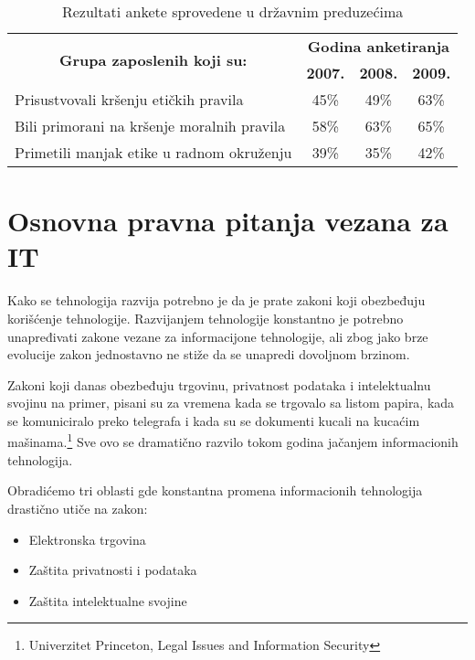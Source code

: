 \documentclass[a4paper]{article}
\begin{document}
{\begin{table}[h!]
\begin{adjustbox}{width=\textwidth}
\begin{tabular}{|l|l|c|c|c|}
\hline
\multicolumn{2}{|c|}{\multirow{2}{*}{\textbf{Grupa zaposlenih koji su:}}}         & \multicolumn{3}{c|}{\textbf{Godina anketiranja}} \\ \cline{3-5} 
\multicolumn{2}{|c|}{}  & \textbf{2007.}    & \textbf{2008.}   & \textbf{2009.}   \\ \hline
\multicolumn{2}{|l|}{\small{Prisustvovali kršenju etičkih pravila}}      & 45\%  & 49\% & 63\%  \\ \hline
\multicolumn{2}{|l|}{\small{Bili primorani na kršenje moralnih pravila}} & 58\%  & 63\% & 65\%  \\ \hline
\multicolumn{2}{|l|}{\small{Primetili manjak etike u radnom okruženju}}  & 39\%  & 35\% & 42\%  \\ \hline
\end{tabular} 
\end{adjustbox} 
\caption{Rezultati ankete sprovedene u državnim preduzećima}
\label{}
\end{table} 

\section{Osnovna pravna pitanja vezana za IT}

Kako se tehnologija razvija potrebno je da je prate zakoni koji obez\-be\-đu\-ju korišćenje tehnologije. Razvijanjem tehnologije konstantno je potrebno unapređivati zakone vezane za informacijone tehnologije, ali zbog jako brze evolucije zakon jednostavno ne stiže da se unapredi dovoljnom brzinom.

Zakoni koji danas obezbeđuju trgovinu, privatnost podataka i intelektualnu svojinu na primer, pisani su za vremena kada se trgovalo sa listom papira, kada se komuniciralo preko telegrafa i kada su se dokumenti kucali na kucaćim mašinama.\footnote{Univerzitet Princeton, Legal Issues and Information Security} Sve ovo se dramatično razvilo tokom godina jačanjem informacionih tehnologija.

Obradićemo tri oblasti gde konstantna promena informacionih tehnologija drastično utiče na zakon:

\begin{itemize}
\item{Elektronska trgovina}
\item{Zaštita privatnosti i podataka}
\item{Zaštita intelektualne svojine}
\end{itemize}

}
\end{document}
